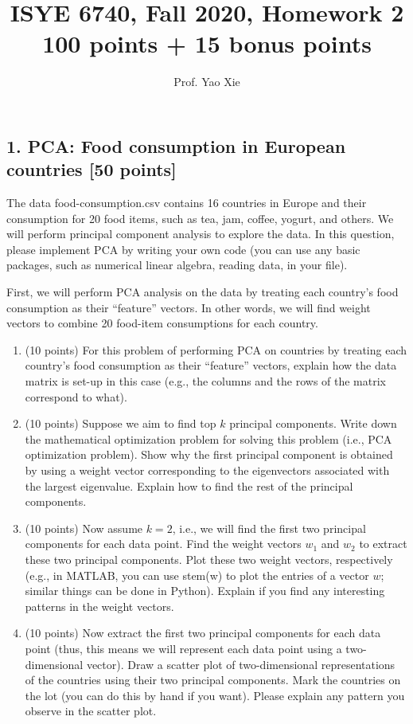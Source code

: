 \documentclass[twoside,12pt]{article}
\begin{document}
\title{ISYE 6740, Fall 2020, Homework 2\\ {\small 100 points + 15 bonus points}}
\author{Prof. Yao Xie}
\date{}
\maketitle

\subsection*{1. PCA: Food consumption in European countries [50 points]}

The data \textsf{food-consumption.csv} contains 16 countries in Europe and their consumption for 20 food items, such as tea, jam, coffee, yogurt, and others. We will perform principal component analysis to explore the data. In this question, please implement PCA by writing your own code (you can use any basic packages, such as numerical linear algebra, reading data, in your file).


\vspace{.1in}
First, we will perform PCA analysis on the data by treating each country's food consumption as their ``feature'' vectors. In other words, we will find weight vectors to combine 20 food-item consumptions for each country.  
 
\begin{enumerate}

\item (10 points) For this problem of performing PCA on countries by treating each country's food consumption as their ``feature'' vectors, explain how the data matrix is set-up in this case (e.g., the columns and the rows of the matrix correspond to what). 

\item (10 points) Suppose we aim to find top $k$ principal components. Write down the mathematical optimization problem for solving this problem (i.e., PCA optimization problem). Show why the first principal component is obtained by using a weight vector corresponding to the eigenvectors associated with the largest eigenvalue. Explain how to find the rest of the principal components. 

\item (10 points) Now assume $k = 2$, i.e., we will find the first two principal components for each data point. Find the weight vectors $w_1$ and $w_2$ to extract these two principal components. Plot these two weight vectors, respectively (e.g., in MATLAB, you can use \textsf{stem(w)} to plot the entries of a vector $w$; similar things can be done in Python). Explain if you find any interesting patterns in the weight vectors. 

\item (10 points) Now extract the first two principal components for each data point (thus, this means we will represent each data point using a two-dimensional vector). Draw a scatter plot of two-dimensional representations of the countries using their two principal components. Mark the countries on the lot (you can do this by hand if you want). Please explain any pattern you observe in the scatter plot.

\end{enumerate}
\end{document}

